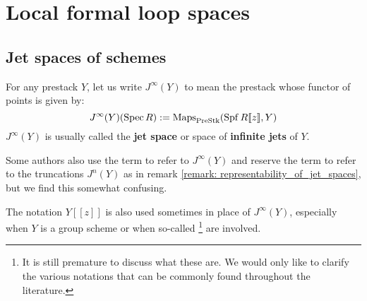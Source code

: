 \section{Local formal loop spaces}
    \subsection{Jet spaces of schemes}
        \begin{definition} \label{def: jet_spaces}
            For any prestack $Y$, let us write $J^{\infty}(Y)$ to mean the prestack whose functor of points is given by:
                $$J^{\infty}(Y)(\operatorname{Spec} R) := \operatorname{Maps}_{\mathrm{Pre}\mathrm{Stk}}(\operatorname{Spf} R[\![z]\!], Y)$$
            $J^{\infty}(Y)$ is usually called the \textbf{jet space} or space of \textbf{infinite jets} of $Y$.
            
            Some authors also use the term  to refer to $J^{\infty}(Y)$ and reserve the term  to refer to the truncations $J^n(Y)$ as in remark \ref{remark: representability_of_jet_spaces}, but we find this somewhat confusing. 

            The notation $Y[\![z]\!]$ is also used sometimes in place of $J^{\infty}(Y)$, especially when $Y$ is a group scheme or when so-called \footnote{It is still premature to discuss what these are. We would only like to clarify the various notations that can be commonly found throughout the literature.} are involved.
        \end{definition}
